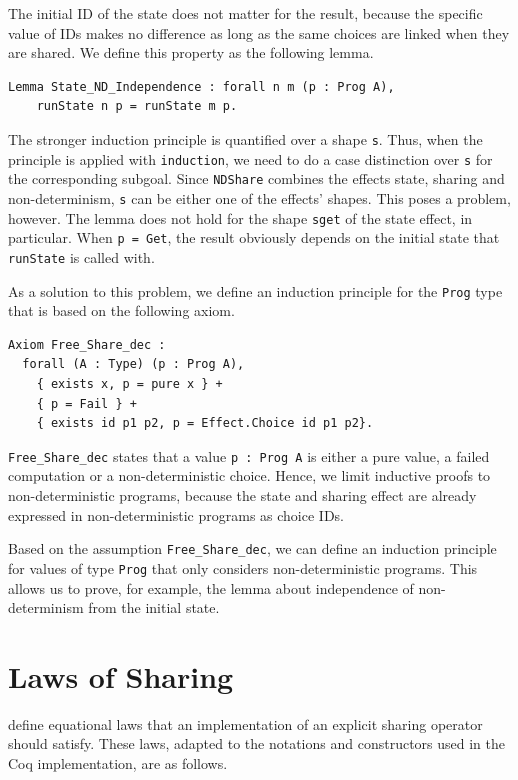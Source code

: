 \documentclass[a4paper, 11pt, fleqn, twoside]{scrreprt}
\newcommand{\cinl}[1]{\texttt{#1}}
\begin{document}
The initial ID of the state does not matter for the result, because the specific value of IDs makes no difference as long as the same choices are linked when they are shared.
We define this property as the following lemma.

\begin{verbatim}
Lemma State_ND_Independence : forall n m (p : Prog A),
    runState n p = runState m p.
\end{verbatim}

The stronger induction principle is quantified over a shape \cinl{s}.
Thus, when the principle is applied with \cinl{induction}, we need to do a case distinction over \cinl{s} for the corresponding subgoal.
Since \cinl{NDShare} combines the effects state, sharing and non-determinism, \cinl{s} can be either one of the effects' shapes.
This poses a problem, however.
The lemma does not hold for the shape \cinl{sget} of the state effect, in particular.
When \cinl{p = Get}, the result obviously depends on the initial state that \cinl{runState} is called with.

As a solution to this problem, we define an induction principle for the \cinl{Prog} type that is based on the following axiom.

\begin{verbatim}
Axiom Free_Share_dec :
  forall (A : Type) (p : Prog A),
    { exists x, p = pure x } +
    { p = Fail } +
    { exists id p1 p2, p = Effect.Choice id p1 p2}.
\end{verbatim}

\cinl{Free_Share_dec} states that a value \cinl{p : Prog A} is either a pure value, a failed computation or a non-deterministic choice.
Hence, we limit inductive proofs to non-deterministic programs, because the state and sharing effect are already expressed in non-deterministic programs as choice IDs.

Based on the assumption \cinl{Free_Share_dec}, we can define an induction principle for values of type \cinl{Prog} that only considers non-deterministic programs.
This allows us to prove, for example, the lemma about independence of non-determinism from the initial state.

\section{Laws of Sharing}
\citet{fischer2009purely} define equational laws that an implementation of an explicit sharing operator should satisfy.
These laws, adapted to the notations and constructors used in the Coq implementation, are as follows.
\end{document}
